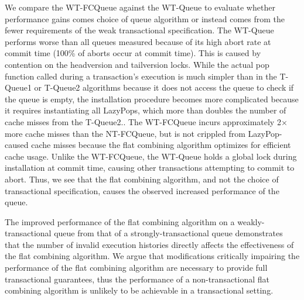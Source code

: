 We compare the WT-FCQueue against the WT-Queue to evaluate whether performance gains comes choice of queue algorithm or instead comes from the fewer requirements of the weak transactional specification. The WT-Queue performs worse than all queues measured because of its high abort rate at commit time (100\% of aborts occur at commit time). This is caused by contention on the headversion and tailversion locks. While the actual pop function called during a transaction's execution is much simpler than in the T-Queue1 or T-Queue2 algorithms because it does not access the queue to check if the queue is empty, the installation procedure becomes more complicated because it requires instantiating all LazyPops, which more than doubles the number of cache misses from the T-Queue2.. The WT-FCQueue incurs approximately 2$\times$ more cache misses than the NT-FCQueue, but is not crippled from LazyPop-caused cache misses because the flat combining algorithm optimizes for efficient cache usage. Unlike the WT-FCQueue, the WT-Queue holds a global lock during installation at commit time, causing other transactions attempting to commit to abort. Thus, we see that the flat combining algorithm, and not the choice of transactional specification, causes the observed increased performance of the queue.

The improved performance of the flat combining algorithm on a weakly-transactional queue from that of a strongly-transactional queue demonstrates that the number of invalid execution histories directly affects the effectiveness of the flat combining algorithm. We argue that modifications critically impairing the performance of the flat combining algorithm are necessary to provide full transactional guarantees, thus the performance of a non-transactional flat combining algorithm is unlikely to be achievable in a transactional setting.
